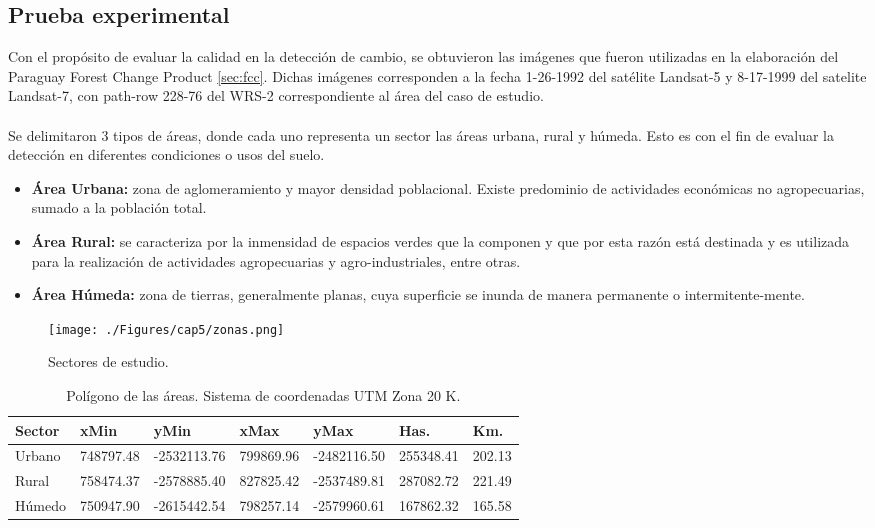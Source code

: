 \subsection{Prueba experimental} 
Con el prop\'osito de evaluar la calidad en la detecci\'on de cambio, se obtuvieron las im\'agenes que fueron utilizadas en la elaboraci\'on del Paraguay Forest Change Product \ref{sec:fcc}. Dichas im\'agenes corresponden a la fecha 1-26-1992	del sat\'elite Landsat-5 y 8-17-1999 del satelite Landsat-7, con path-row 228-76 del WRS-2 correspondiente al \'area del caso de estudio.\\~\\
Se delimitaron 3 tipos de \'areas, donde cada uno representa un sector las \'areas urbana, rural y h\'umeda. Esto es con el fin de evaluar la detecci\'on en diferentes condiciones o usos del suelo.
\begin{itemize}
	\item \textbf{\'Area Urbana:} zona de aglomeramiento y mayor densidad poblacional. Existe predominio  de actividades econ\'omicas no agropecuarias, sumado a la poblaci\'on total. 
	\item \textbf{\'Area Rural:} se caracteriza por la inmensidad de espacios verdes que la componen y que por esta razón est\'a destinada y es utilizada para la realizaci\'on de actividades agropecuarias y agro-industriales, entre otras.
	\item \textbf{\'Area H\'umeda:}	zona de tierras, generalmente planas, cuya superficie se inunda de manera permanente o intermitente-mente.
\end{itemize}
\begin{figure}[H]
	\centering
	\texttt{[image: ./Figures/cap5/zonas.png]}
	\caption{Sectores de estudio.}
	\label{fig:zonasEva}
\end{figure}
\begin{table}[H]
	\centering
	\begin{tabular}{|l|l|l|l|l|l|l|}
		\hline
		\rowcolor[HTML]{EFEFEF} 
		\textbf{Sector} & \textbf{xMin} & \textbf{yMin} & \textbf{xMax} & \textbf{yMax} & \textbf{Has.} & \textbf{Km.} \\ \hline
		Urbano          & 748797.48     & -2532113.76   & 799869.96     & -2482116.50 & 255348.41 & 202.13   \\ \hline
		Rural           & 758474.37     & -2578885.40   & 827825.42     & -2537489.81 & 287082.72 & 221.49  \\ \hline
		Húmedo          & 750947.90     & -2615442.54   & 798257.14     & -2579960.61 & 167862.32 & 165.58	  \\ \hline
	\end{tabular}
		\caption{Pol\'igono de las \'areas. Sistema de coordenadas UTM Zona 20 K. }
		\label{t:poligonos}
\end{table}
